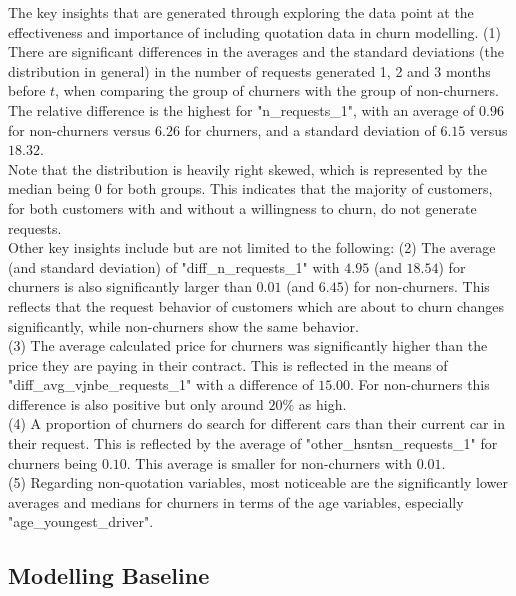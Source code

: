 \documentclass[12pt,titlepage]{article}
\begin{document}
\noindent
The key insights that are generated through exploring the data point at the effectiveness and importance of including quotation data in churn modelling. (1) There are significant differences in the averages and the standard deviations (the distribution in general) in the number of requests generated 1, 2 and 3 months before $t$, when comparing the group of churners with the group of non-churners. The relative difference is the highest for "n\_requests\_1", with an average of $0.96$ for non-churners versus $6.26$ for churners, and a standard deviation of $6.15$ versus $18.32$. \\
Note that the distribution is heavily right skewed, which is represented by the median being $0$ for both groups. This indicates that the majority of customers, for both customers with and without a willingness to churn, do not generate requests. \\
Other key insights include but are not limited to the following: (2) The average (and standard deviation) of "diff\_n\_requests\_1" with $4.95$ (and $18.54$) for churners is also significantly larger than $0.01$ (and $6.45$) for non-churners. This reflects that the request behavior of customers which are about to churn changes significantly, while non-churners show the same behavior. \\
(3) The average calculated price for churners was significantly higher than the price they are paying in their contract. This is reflected in the means of "diff\_avg\_vjnbe\_requests\_1" with a difference of $15.00$. For non-churners this difference is also positive but only around $20\%$ as high. \\
(4) A proportion of churners do search for different cars than their current car in their request. This is reflected by the average of "other\_hsntsn\_requests\_1" for churners being $0.10$. This average is smaller for non-churners with $0.01$. \\
(5) Regarding non-quotation variables, most noticeable are the significantly lower averages and medians for churners in terms of the age variables, especially "age\_youngest\_driver". \\

\subsection{Modelling Baseline} \par
\end{document}
